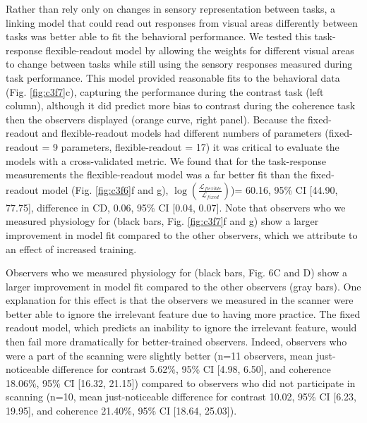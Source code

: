 Rather than rely only on changes in sensory representation between tasks, a linking model that could read out responses from visual areas differently between tasks was better able to fit the behavioral performance. We tested this task-response flexible-readout model by allowing the weights for different visual areas to change between tasks while still using the sensory responses measured during task performance. This model provided reasonable fits to the behavioral data (Fig. \ref{fig:c3f7}c), capturing the performance during the contrast task (left column), although it did predict more bias to contrast during the coherence task then the observers displayed (orange curve, right panel). Because the fixed-readout and flexible-readout models had different numbers of parameters (fixed-readout = 9 parameters, flexible-readout = 17) it was critical to evaluate the models with a cross-validated metric. We found that for the task-response measurements the flexible-readout model was a far better fit than the fixed-readout model (Fig. \ref{fig:c3f6}f and g), $\log(\frac{\mathcal{L}_{flexible}}{\mathcal{L}_{fixed}})$)= 60.16, 95\% CI [44.90, 77.75], difference in CD, 0.06, 95\% CI [0.04, 0.07]. Note that observers who we measured physiology for (black bars, Fig. \ref{fig:c3f7}f and g) show a larger improvement in model fit compared to the other observers, which we attribute to an effect of increased training.

Observers who we measured physiology for (black bars, Fig. 6C and D) show a larger improvement in model fit compared to the other observers (gray bars). One explanation for this effect is that the observers we measured in the scanner were better able to ignore the irrelevant feature due to having more practice. The fixed readout model, which predicts an inability to ignore the irrelevant feature, would then fail more dramatically for better-trained observers. Indeed, observers who were a part of the scanning were slightly better (n=11 observers, mean just-noticeable difference for contrast 5.62\%, 95\% CI [4.98, 6.50], and coherence 18.06\%, 95\% CI [16.32, 21.15]) compared to observers who did not participate in scanning (n=10, mean just-noticeable difference for contrast 10.02, 95\% CI [6.23, 19.95], and coherence 21.40\%, 95\% CI [18.64, 25.03]). 

